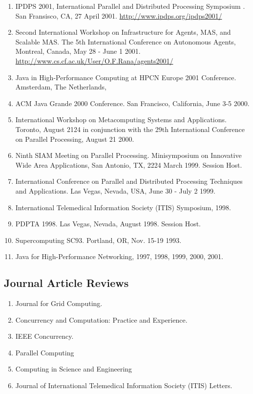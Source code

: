 \documentclass{article}
\begin{document}
\begin{enumerate}
\item  IPDPS 2001, International Parallel and Distributed Processing Symposium . San Fransisco, CA, 27 April 2001. \url{http://www.ipdps.org/ipdps2001/} 
\item  Second International Workshop on Infrastructure for Agents, MAS, and Scalable MAS. The 5th International Conference on Autonomous Agents, Montreal, Canada, May 28 - June 1 2001. \url{http://www.cs.cf.ac.uk/User/O.F.Rana/agents2001/}
\item  Java in High-Performance Computing at HPCN Europe 2001 Conference. Amsterdam, The Netherlands, 
\item  ACM Java Grande 2000 Conference. San Francisco, California, June 3-5 2000. 
\item  International Workshop on Metacomputing Systems and Applications. Toronto, August 2124  in conjunction with the 29th International Conference on Parallel Processing, August 21 2000. 
\item  Ninth SIAM Meeting on Parallel Processing. Minisymposium on Innovative Wide Area Applications, San Antonio, TX, 2224 March 1999. Session Host. 
\item  International Conference on Parallel and Distributed Processing Techniques and Applications. Las Vegas, Nevada, USA, June 30 - July 2 1999. 
\item  International Telemedical Information Society (ITIS) Symposium, 1998. 
\item  PDPTA 1998. Las Vegas, Nevada, August 1998. Session Host. 
\item  Supercomputing SC93. Portland, OR, Nov. 15-19 1993. 
\item  Java for High-Performance Networking, 1997, 1998, 1999, 2000, 2001. 
\end{enumerate}
 
\subsection{Journal Article Reviews}

\begin{enumerate}
\item  Journal for Grid Computing. 
\item  Concurrency and Computation: Practice and Experience. 
\item  IEEE Concurrency. 
\item  Parallel Computing 
\item  Computing in Science and Engineering
\item  Journal of International Telemedical Information Society (ITIS) Letters. 
\end{enumerate}
\end{document}
